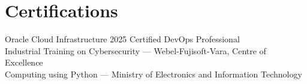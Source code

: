 \section{Certifications}
 \begin{itemize}[leftmargin=0.15in, label={}]
    \small{\item{
     Oracle Cloud Infrastructure 2025 Certified DevOps Professional \\
     Industrial Training on Cybersecurity --- Webel-Fujisoft-Vara, Centre of Excellence \\
     Computing using Python --- Ministry of Electronics and Information Technology
    }}
 \end{itemize}
